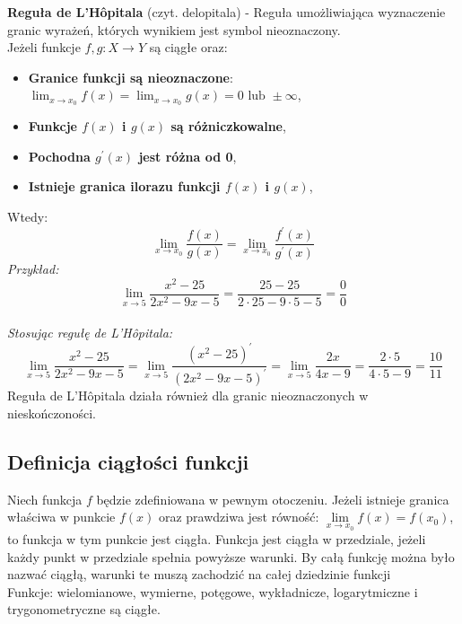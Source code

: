 \documentclass[14pt,a4paper]{extarticle}
\begin{document}
\noindent\textbf{Reguła de L'Hôpitala} (czyt. delopitala) - Reguła umożliwiająca wyznaczenie granic wyrażeń,
których wynikiem jest symbol nieoznaczony.\\
Jeżeli funkcje $f,g:X \rightarrow Y$ są ciągłe oraz:
\begin{itemize}
   \item \textbf{Granice funkcji są nieoznaczone}: $\displaystyle \lim_{x\to x_{0}}f(x) = \lim_{x\to x_{0}}g(x) = 0 \text{ lub } \pm\infty$,
   \item \textbf{Funkcje $f(x)$ i $g(x)$ są różniczkowalne},
   \item \textbf{Pochodna $g^{\prime}(x)$ jest różna od 0},
   \item \textbf{Istnieje granica ilorazu funkcji $f(x)$ i $g(x)$},
\end{itemize}
Wtedy:
$$\lim_{x \to x_{0}}\dfrac{f(x)}{g(x)} = \lim_{x \to x_{0}}\dfrac{f^{\prime}(x)}{g^{\prime}(x)}$$\hfill\break
\noindent\textit{Przykład:}
$$\lim_{x\to 5}\frac{x^{2}-25}{2x^{2}-9x-5} = \frac{25-25}{2\cdot 25 - 9 \cdot 5 -5} = \frac{0}{0}$$
\\\noindent\textit{Stosując regułę de L'Hôpitala:}
$$\lim_{x\to 5}\frac{x^{2}-25}{2x^{2}-9x-5} = \lim_{x\to 5}\frac{(x^{2}-25)^{\prime}}{(2x^{2}-9x-5)^{\prime}} = \lim_{x\to 5}\frac{2x}{4x-9} = \frac{2\cdot 5}{4\cdot 5 - 9} = \frac{10}{11}$$
Reguła de L'Hôpitala działa również dla granic nieoznaczonych w nieskończoności.

\subsection{Definicja ciągłości funkcji}
Niech funkcja $f$ będzie zdefiniowana w pewnym otoczeniu. Jeżeli istnieje granica właściwa
w punkcie $f(x)$ oraz prawdziwa jest równość: $\lim\limits_{x \to x_{0}}f(x) = f(x_{0})$, to
funkcja w tym punkcie jest ciągła. Funkcja jest ciągła w przedziale, jeżeli każdy punkt w przedziale
spełnia powyższe warunki. By całą funkcję można było nazwać ciągłą, warunki te muszą zachodzić na 
całej dziedzinie funkcji\\
Funkcje: wielomianowe, wymierne, potęgowe, wykładnicze, logarytmiczne i trygonometryczne są ciągłe.
\end{document}
